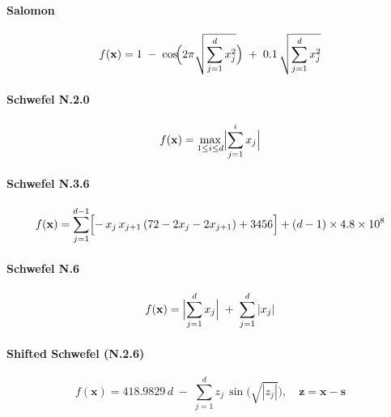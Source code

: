 \vspace{.095em}
\paragraph{Salomon}
\begin{equation}
f(\mathbf{x})
= 1 \;-\;\cos\!\Bigl(2\pi\sqrt{\sum_{j=1}^d x_j^2}\Bigr)
\;+\;0.1\,\sqrt{\sum_{j=1}^d x_j^2}
\label{ben:Salomon}
\end{equation}

\vspace{.095em}
\paragraph{Schwefel N.2.0}
\begin{equation}
f(\mathbf{x})
= \max_{1\le i\le d}\Bigl|\sum_{j=1}^{i} x_j\Bigr|
\label{ben:SchwefelN20}
\end{equation}

\vspace{.095em}
\paragraph{Schwefel N.3.6}
\begin{equation}
f(\mathbf{x})
= \sum_{j=1}^{d-1}\Bigl[-\,x_j\,x_{j+1}\,(72 - 2x_j - 2x_{j+1}) + 3456\Bigr] \\
 + (d-1)\times 4.8\times10^8
\label{ben:SchwefelN36}
\end{equation}

\vspace{.095em}
\paragraph{Schwefel N.6}
\begin{equation}
f(\mathbf{x})
= \Bigl|\sum_{j=1}^{d} x_j\Bigr| \;+\; \sum_{j=1}^{d} |x_j|
\label{ben:SchwefelN6}
\end{equation}

\vspace{.095em}
\paragraph{Shifted Schwefel (N.2.6)}
\begin{equation}
f(\mathbf{x})
= 418.9829\,d \;-\;\sum_{j=1}^{d} z_j\,\sin\!\bigl(\sqrt{|z_j|}\bigr),
\quad \mathbf{z} = \mathbf{x} - \mathbf{s}
\label{ben:ShiftedSchwefel}
\end{equation}

